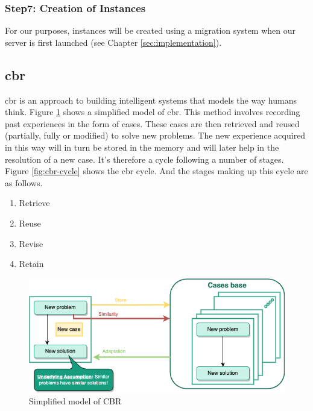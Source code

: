     
    \subsubsection{Step7: Creation of Instances}
    For our purposes, instances will be created using a migration system when our server is first launched (see Chapter  \ref{sec:implementation}).
    

\subsection{\acrfull{cbr} \label{subsec:cbr}}
\acrshort{cbr} is an approach to building intelligent systems that models the way humans think. Figure \ref{fig:simple-cbr} shows a simplified model of \acrshort{cbr}. This method involves recording past experiences in the form of cases. These cases are then retrieved and reused (partially, fully or modified) to solve new problems. The new experience acquired in this way will in turn be stored in the memory and will later help in the resolution of a new case. It's therefore a cycle following a number of stages. Figure \ref{fig:cbr-cycle} shows the \acrshort{cbr} cycle. And the stages making up this cycle are as follows.
    
    \begin{enumerate}
        \item Retrieve
        \item Reuse
        \item Revise
        \item Retain
    \end{enumerate}
    
    \begin{figure}[h]
    \centering
    \includegraphics[width=\textwidth]{images/Concept-simplified-cbr-Simplified CBR princip.drawio.png}
    \caption{\label{fig:simple-cbr}  Simplified model of CBR \cite{probSolCBR}}
    \end{figure}
    
